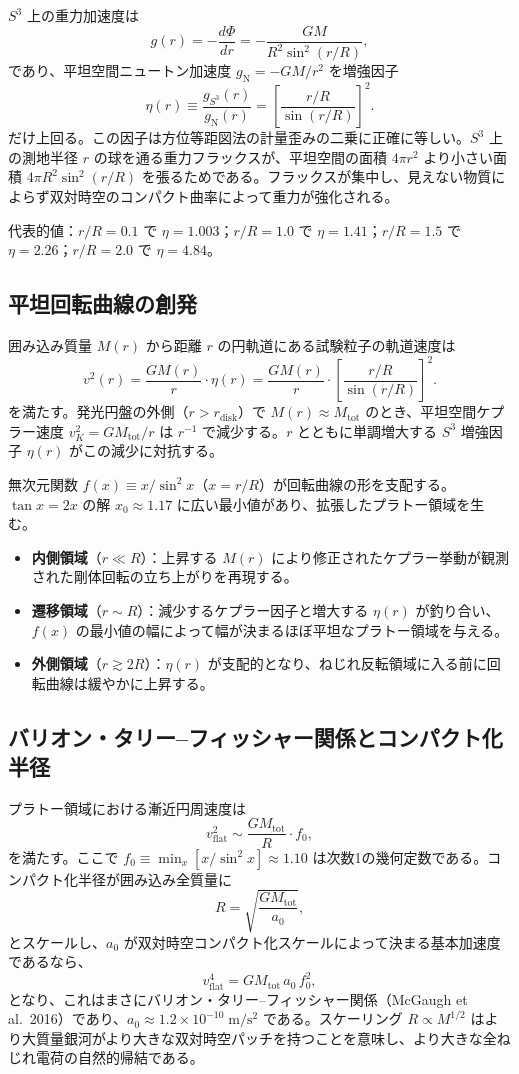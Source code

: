 \documentclass[a4paper]{article}
\begin{document}
$S^3$ 上の重力加速度は
\[
g(r) = -\frac{d\Phi}{dr} = -\frac{GM}{R^2 \sin^2(r/R)},
\]
であり、平坦空間ニュートン加速度 $g_{\text{N}} = -GM/r^2$ を増強因子
\[
\eta(r) \equiv \frac{g_{S^3}(r)}{g_{\text{N}}(r)} = \left[\frac{r/R}{\sin(r/R)}\right]^2.
\]
だけ上回る。この因子は方位等距図法の計量歪みの二乗に正確に等しい。$S^3$ 上の測地半径 $r$ の球を通る重力フラックスが、平坦空間の面積 $4\pi r^2$ より小さい面積 $4\pi R^2 \sin^2(r/R)$ を張るためである。フラックスが集中し、見えない物質によらず双対時空のコンパクト曲率によって重力が強化される。

代表的値：$r/R = 0.1$ で $\eta = 1.003$；$r/R = 1.0$ で $\eta = 1.41$；$r/R = 1.5$ で $\eta = 2.26$；$r/R = 2.0$ で $\eta = 4.84$。

\subsection{平坦回転曲線の創発}

囲み込み質量 $M(r)$ から距離 $r$ の円軌道にある試験粒子の軌道速度は
\[
v^2(r) = \frac{GM(r)}{r} \cdot \eta(r) = \frac{GM(r)}{r} \cdot \left[\frac{r/R}{\sin(r/R)}\right]^2.
\]
を満たす。発光円盤の外側（$r > r_{\text{disk}}$）で $M(r) \approx M_{\text{tot}}$ のとき、平坦空間ケプラー速度 $v_K^2 = GM_{\text{tot}}/r$ は $r^{-1}$ で減少する。$r$ とともに単調増大する $S^3$ 増強因子 $\eta(r)$ がこの減少に対抗する。

無次元関数 $f(x) \equiv x / \sin^2 x$（$x = r/R$）が回転曲線の形を支配する。$\tan x = 2x$ の解 $x_0 \approx 1.17$ に広い最小値があり、拡張したプラトー領域を生む。
\begin{itemize}
  \item \textbf{内側領域}（$r \ll R$）：上昇する $M(r)$ により修正されたケプラー挙動が観測された剛体回転の立ち上がりを再現する。
  \item \textbf{遷移領域}（$r \sim R$）：減少するケプラー因子と増大する $\eta(r)$ が釣り合い、$f(x)$ の最小値の幅によって幅が決まるほぼ平坦なプラトー領域を与える。
  \item \textbf{外側領域}（$r \gtrsim 2R$）：$\eta(r)$ が支配的となり、ねじれ反転領域に入る前に回転曲線は緩やかに上昇する。
\end{itemize}

\subsection{バリオン・タリー--フィッシャー関係とコンパクト化半径}

プラトー領域における漸近円周速度は
\[
v_{\text{flat}}^2 \sim \frac{GM_{\text{tot}}}{R} \cdot f_0,
\]
を満たす。ここで $f_0 \equiv \min_x [x/\sin^2 x] \approx 1.10$ は次数1の幾何定数である。コンパクト化半径が囲み込み全質量に
\[
R = \sqrt{\frac{GM_{\text{tot}}}{a_0}},
\]
とスケールし、$a_0$ が双対時空コンパクト化スケールによって決まる基本加速度であるなら、
\[
v_{\text{flat}}^4 = G M_{\text{tot}} \, a_0 \, f_0^2,
\]
となり、これはまさにバリオン・タリー--フィッシャー関係（McGaugh et al.\ 2016）であり、$a_0 \approx 1.2 \times 10^{-10}\;\mathrm{m/s^2}$ である。スケーリング $R \propto M^{1/2}$ はより大質量銀河がより大きな双対時空パッチを持つことを意味し、より大きな全ねじれ電荷の自然的帰結である。
\end{document}

